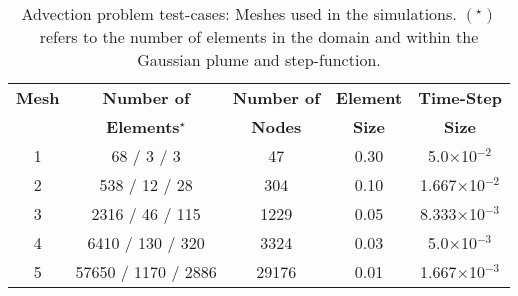 

\begin{table}
\begin{center}
\begin{tabular}{||c|| c c c c ||}
\hline\hline
{\bf Mesh} & {\bf Number of}        & {\bf Number of} & {\bf Element}  & {\bf Time-Step}    \\
           & {\bf Elements}$^{\star}$&{\bf Nodes}      & {\bf Size}     & {\bf Size}  \\
\hline
1          & 68 / 3 / 3                & 47              & 0.30           & 5.0$\times$10$^{-2}$ \\
2          & 538 / 12  / 28             & 304             & 0.10           & 1.667$\times$10$^{-2}$ \\
3          & 2316 / 46  / 115            & 1229            & 0.05           & 8.333$\times$10$^{-3}$ \\
4          & 6410 / 130  / 320           & 3324            & 0.03           & 5.0$\times$10$^{-3}$ \\
5          & 57650 / 1170 / 2886          & 29176           & 0.01           & 1.667$\times$10$^{-3}$ \\
\hline\hline
\end{tabular}
\caption{Advection problem test-cases: Meshes used in the simulations. $\left(^{\star}\right)$ refers to the number of elements in the domain and within the Gaussian plume and step-function. \label{table:meshplume}}
\end{center}
\end{table}
